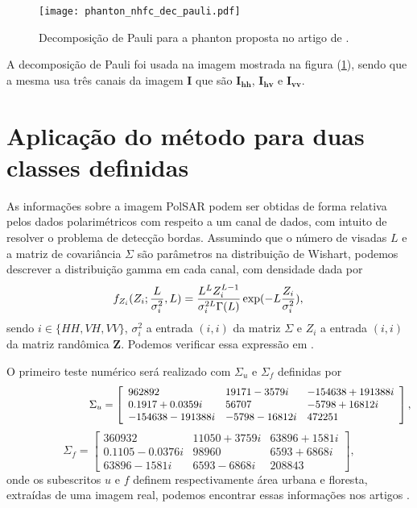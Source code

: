 \begin{figure}[hbt]
\centering
	\texttt{[image: phanton\_nhfc\_dec\_pauli.pdf]}
	\caption{Decomposição de Pauli para a phanton proposta no artigo de \citet{nhfc}.}\label{cap_acf_fig01}
\end{figure}
A decomposição de Pauli foi usada na imagem mostrada na figura (\ref{cap_acf_fig01}), sendo que a mesma usa três canais da imagem \textbf{I} que são $\mathbf{I_{hh}}$, $\mathbf{I_{hv}}$ e $\mathbf{I_{vv}}$. 
	
\section{Aplicação do método  para duas classes definidas}

As informações sobre a imagem PolSAR podem ser obtidas de forma relativa pelos dados polarimétricos com respeito a um canal de dados, com intuito de resolver o problema de detecção bordas. Assumindo que o número de visadas $L$ e a matriz de covariância  $\Sigma$ são parâmetros na distribuição de Wishart, podemos descrever a distribuição gamma em cada canal, com densidade dada por 
\begin{equation}\label{cap_acf_23}
	f_{Z_{i}}(Z_{i};\frac{L}{\sigma_{i}^2},L)=\frac{L^{L}Z_{i}^{L-1}}{\sigma_{i}^{2L}\Gamma(L)} \exp(-L\frac{Z_{i}}{\sigma_{i}^2}), \\
\end{equation}
sendo $i\in \{HH, VH, VV\}$, $\sigma_{i}^2$ a entrada $(i,i)$ da matriz $\Sigma$ e $Z_{i}$ a entrada $(i,i)$ da matriz randômica $\mathbf{Z}$. Podemos verificar essa expressão em \citep{fnc, nhfc, hsbmp}.	 

O primeiro teste numérico será realizado com $\Sigma_u$ e $\Sigma_f$ definidas por
\begin{equation}\label{cap_acf_24}
	\hspace{2.75cm} \Sigma_{u}= \left[
\begin{array}{lll}
	962892             &19171 - 3579i&     -154638 + 191388i \\
	0.1917 + 0.0359i   &56707        &     -5798 + 16812i  \\
	-154638 - 191388i  &-5798 - 16812i&      472251 
\end{array}
\right],
\end{equation}
\begin{equation}\label{cap_acf_25}
 \Sigma_{f}= \left[
\begin{array}{lll}
	360932            & 11050 + 3759i&   63896 + 1581i \\
	0.1105 - 0.0376i  & 98960       &   6593 + 6868i \\
	63896  - 1581i    & 6593  - 6868i&   208843
\end{array}
\right],
\end{equation}
onde os subescritos $u$ e $f$ definem respectivamente área urbana e floresta, extraídas de uma imagem real, podemos encontrar essas informações nos artigos \citep{fbgm, nhfc}.

